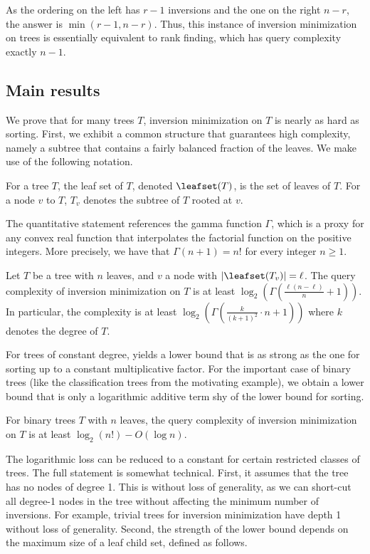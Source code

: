 As the ordering on the left has $r-1$ inversions and the one on the right $n-r$, the answer is $\min(r-1,n-r)$. Thus, this instance of inversion minimization on trees is essentially equivalent to rank finding, which has query complexity exactly $n-1$.

\subsection{Main results} 
%
We prove that for many trees $T$, inversion minimization on $T$ is nearly as hard as sorting. First, we exhibit a common structure that guarantees high complexity, namely a subtree that contains a fairly balanced fraction of the leaves. We make use of the following notation.
\begin{definition}
For a tree $T$, the leaf set of $T$, denoted $\leafset(T)$, is the set of leaves of $T$. For a node $v$ to $T$, $T_v$ denotes the subtree of $T$ rooted at $v$.
\end{definition}
The quantitative statement references the gamma function $\Gamma$, which is a proxy for any convex real function that interpolates the factorial function on the positive integers.  More precisely, %
we have that $\Gamma(n+1) = n!$ for every integer $n \ge 1$.
%
\begin{theorem}\label{thm:main:general}
Let $T$ be a tree with $n$ leaves, and $v$ a node with $\lvert\leafset(T_v)\rvert = \ell$. The query complexity of inversion minimization on $T$ is at least $\log_2(\Gamma( \frac{\ell(n-\ell)}{n}+1 ))$. In particular, the complexity is at least $\log_2(\Gamma(\frac{k}{(k+1)^2} \cdot n+1))$ where $k$ denotes the degree of $T$.
\end{theorem}
For trees of constant degree,  yields a lower bound that is as strong as the one for sorting up to a constant multiplicative factor. For the important case of binary trees (like the classification trees from the motivating example), we obtain a lower bound that is only a logarithmic additive term shy of the lower bound for sorting.
\begin{theorem}\label{thm:main:binary}
For binary trees $T$ with $n$ leaves, the query complexity of inversion minimization on $T$ is at least $\log_2(n!) - O(\log n)$.
\end{theorem}
The logarithmic loss can be reduced to a constant for certain restricted classes of trees. The full statement is somewhat technical. First, it assumes that the tree has no nodes of degree 1. This is without loss of generality, as we can short-cut all degree-1 nodes in the tree without affecting the minimum number of inversions. For example, trivial trees for inversion minimization have depth 1 without loss of generality. Second, the strength of the lower bound depends on the maximum size of a leaf child set, defined as follows.
